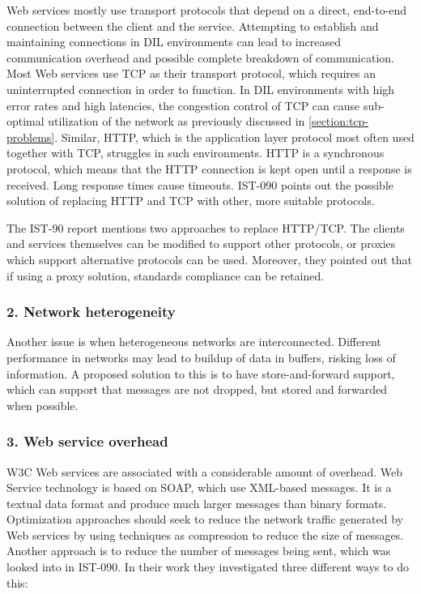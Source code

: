 Web services mostly use transport protocols that depend on a direct, end-to-end
connection between the client and the service. Attempting to establish and
maintaining connections in DIL environments can lead to increased communication
overhead and possible complete breakdown of communication. Most Web services use
TCP as their transport protocol, which requires an uninterrupted connection in
order to function. In DIL environments with high error rates and high latencies,
the congestion control of TCP can cause sub-optimal utilization of the network
as previously discussed in \cref{section:tcp-problems}. Similar, HTTP, which is
the application layer protocol most often used together with TCP, struggles in
such environments. HTTP is a synchronous protocol, which means that the HTTP
connection is kept open until a response is received. Long response times cause
timeouts. IST-090 points out the possible solution of replacing HTTP and TCP with
other, more suitable protocols.

The IST-90 report mentions two approaches to replace HTTP/TCP. The clients and
services themselves can be modified to support other protocols, or proxies
which support alternative protocols can be used\cite{ist-090}. Moreover, they
pointed out that if using a proxy solution, standards compliance can be
retained.


\subsubsection{2. Network heterogeneity}

Another issue is when heterogeneous networks are interconnected. Different
performance in networks may lead to buildup of data in buffers, risking loss of
information. A proposed solution to this is to have store-and-forward support,
which can support that messages are not dropped, but stored and forwarded when
possible.


\subsubsection{3. Web service overhead}

W3C Web services are associated with a considerable amount of overhead. Web
Service technology is based on SOAP, which use XML-based messages. It is a
textual data format and produce much larger messages than binary formats.
Optimization approaches should seek to reduce the network traffic generated by
Web services by using techniques as compression to reduce the size of messages.
Another approach is to reduce the number of messages being sent, which was
looked into in IST-090\cite{ist-090}. In their work they investigated three
different ways to do this:

